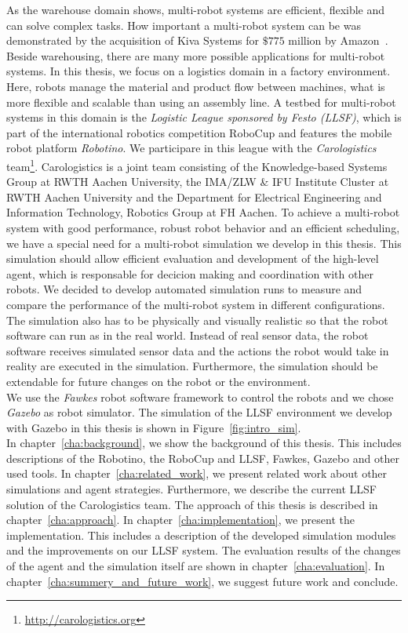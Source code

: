 As the warehouse domain shows, multi-robot systems are efficient, flexible and can solve complex tasks. How important a multi-robot system can be was demonstrated by the acquisition of Kiva Systems for $\$775$ million by Amazon~\cite{kiva_amazon}. Beside warehousing, there are many more possible applications for multi-robot systems. In this thesis, we focus on a logistics domain in a factory environment. Here, robots manage the material and product flow between machines, what is more flexible and scalable than using an assembly line. A testbed for multi-robot systems in this domain is the \textit{Logistic League sponsored by Festo (LLSF)}, which is part of the international robotics competition RoboCup and features the mobile robot platform \textit{Robotino}. We participare in this league with the \textit{Carologistics} team\footnote{\url{http://carologistics.org}}. Carologistics is a joint team consisting of the Knowledge-based Systems Group at RWTH Aachen University, the IMA/ZLW \& IFU Institute Cluster at RWTH Aachen University and the Department for Electrical Engineering and Information Technology, Robotics Group at FH Aachen. To achieve a multi-robot system with good performance, robust robot behavior and an efficient scheduling, we have a special need for a multi-robot simulation we develop in this thesis. This simulation should allow efficient evaluation and development of the high-level agent, which is responsable for decicion making and coordination with other robots. We decided to develop automated simulation runs to measure and compare the performance of the multi-robot system in different configurations. The simulation also has to be physically and visually realistic so that the robot software can run as in the real world. Instead of real sensor data, the robot software receives simulated sensor data and the actions the robot would take in reality are executed in the simulation. Furthermore, the simulation should be extendable for future changes on the robot or the environment.\\
We use the \textit{Fawkes} robot software framework to control the robots and we chose \textit{Gazebo} as robot simulator. The simulation of the LLSF environment we develop with Gazebo in this thesis is shown in Figure~\ref{fig:intro_sim}.\\
In chapter~\ref{cha:background}, we show the background of this thesis. This includes descriptions of the Robotino, the RoboCup and LLSF, Fawkes, Gazebo and other used tools. In chapter~\ref{cha:related_work}, we present related work about other simulations and agent strategies. Furthermore, we describe the current LLSF solution of the Carologistics team. The approach of this thesis is described in chapter~\ref{cha:approach}. In chapter~\ref{cha:implementation}, we present the implementation. This includes a description of the developed simulation modules and the improvements on our LLSF system. The evaluation results of the changes of the agent and the simulation itself are shown in chapter~\ref{cha:evaluation}. In chapter~\ref{cha:summery_and_future_work}, we suggest future work and conclude.



